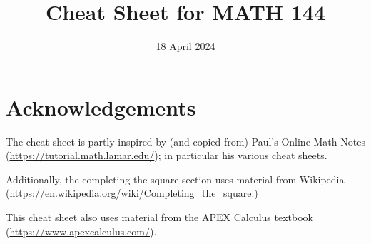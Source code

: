 \documentclass[9pt]{extarticle}
\title{Cheat Sheet for MATH 144}
\date{18 April 2024}
\theoremstyle{definition}
\theoremstyle{remark}
\begin{document}
	
	\pagebreak
	
	\pagebreak
	
	\pagebreak
	

	\section{Acknowledgements}
	The cheat sheet is partly inspired by (and copied from) Paul's Online Math Notes (\url{https://tutorial.math.lamar.edu/}); in particular his various cheat sheets.

	Additionally, the completing the square section uses material from Wikipedia (\url{https://en.wikipedia.org/wiki/Completing_the_square}.)

	This cheat sheet also uses material from the APEX Calculus textbook (\url{https://www.apexcalculus.com/}).
\end{document}
